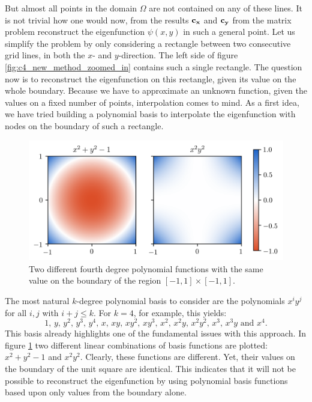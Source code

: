 But almost all points in the domain $\Omega$ are not contained on any of these lines. It is not trivial how one would now, from the results $\vb{c_x}$ and $\vb{c_y}$ from the matrix problem reconstruct the eigenfunction $\psi(x, y)$ in such a general point. Let us simplify the problem by only considering a rectangle between two consecutive grid lines, in both the $x$- and $y$-direction. The left side of figure \ref{fig:c4_new_method_zoomed_in} contains such a single rectangle. The question now is to reconstruct the eigenfunction on this rectangle, given its value on the whole boundary. Because we have to approximate an unknown function, given the values on a fixed number of points, interpolation comes to mind. As a first idea, we have tried building a polynomial basis to interpolate the eigenfunction with nodes on the boundary of such a rectangle.

\begin{figure}
    \begin{center}
        \includegraphics[width=1\textwidth]{img/chapter4/nm_interpolation.png}
    \end{center}
    \caption{Two different fourth degree polynomial functions with the same value on the boundary of the region $[-1, 1] \times [-1, 1]$.}\label{fig:c4_interpolation_boundary issue}
\end{figure}

The most natural $k$-degree polynomial basis to consider are the polynomials $x^i y^j$ for all $i, j$ with $i + j \leq k$. For $k = 4$, for example, this yields:
$$
    1\text{, } y\text{, } y^2\text{, } y^3\text{, } y^4\text{, } x\text{, } x y\text{, } x y^2\text{, } x y^3\text{, } x^2\text{, } x^2 y\text{, } x^2 y^2\text{, } x^3\text{, } x^3 y\text{ and } x^4\text{.}
$$
This basis already highlights one of the fundamental issues with this approach. In figure \ref{fig:c4_interpolation_boundary issue} two different linear combinations of basis functions are plotted: $x^2 + y^2 -1$ and $x^2y^2$. Clearly, these functions are different. Yet, their values on the boundary of the unit square are identical. This indicates that it will not be possible to reconstruct the eigenfunction by using polynomial basis functions based upon only values from the boundary alone.

